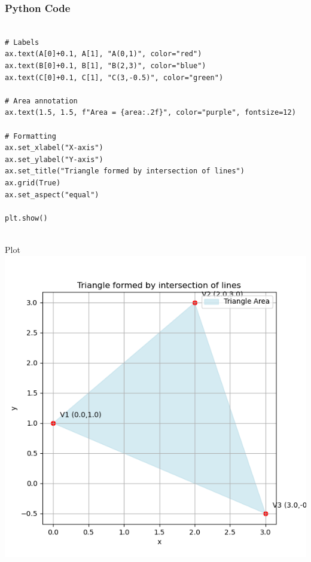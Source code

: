 \documentclass{beamer}
\begin{document}
\begin{frame}[fragile]
    \frametitle{Python Code}
    \begin{lstlisting}

# Labels
ax.text(A[0]+0.1, A[1], "A(0,1)", color="red")
ax.text(B[0]+0.1, B[1], "B(2,3)", color="blue")
ax.text(C[0]+0.1, C[1], "C(3,-0.5)", color="green")

# Area annotation
ax.text(1.5, 1.5, f"Area = {area:.2f}", color="purple", fontsize=12)

# Formatting
ax.set_xlabel("X-axis")
ax.set_ylabel("Y-axis")
ax.set_title("Triangle formed by intersection of lines")
ax.grid(True)
ax.set_aspect("equal")

plt.show()


    \end{lstlisting}
\end{frame}

\begin{frame}{Plot}
    \centering
    \includegraphics[width=\columnwidth, height=0.8\textheight, keepaspectratio]{Figs/Fig1.png}     
\end{frame}
\end{document}
